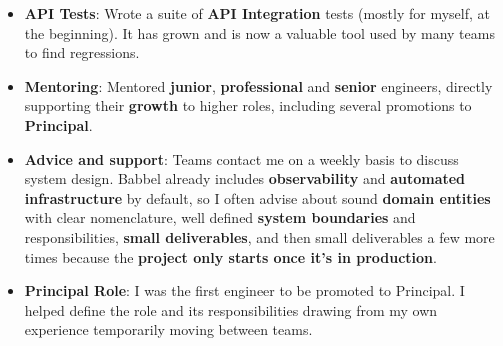 \documentclass[10pt,a4paper,ragged2e,withhyper]{altacv}
\begin{document}
\begin{paracol}{2}
{\begin{itemize}
\item \textbf{API Tests}: Wrote a suite of \textbf{API Integration} tests (mostly for myself, at the beginning). It has grown and is now a valuable tool used by many teams to find regressions.
\item \textbf{Mentoring}: Mentored \textbf{junior}, \textbf{professional} and \textbf{senior} engineers, directly supporting their \textbf{growth} to higher roles, including several promotions to \textbf{Principal}.
\item \textbf{Advice and support}: Teams contact me on a weekly basis to discuss system design. Babbel already includes \textbf{observability} and \textbf{automated infrastructure} by default, so I often advise about sound \textbf{domain entities} with clear nomenclature, well defined \textbf{system boundaries} and responsibilities, \textbf{small deliverables}, and then small deliverables a few more times because the \textbf{project only starts once it's in production}.
\item \textbf{Principal Role}: I was the first engineer to be promoted to Principal. I helped define the role and its responsibilities drawing from my own experience temporarily moving between teams.
\end{itemize}
}

\divider









\end{paracol}
\end{document}
